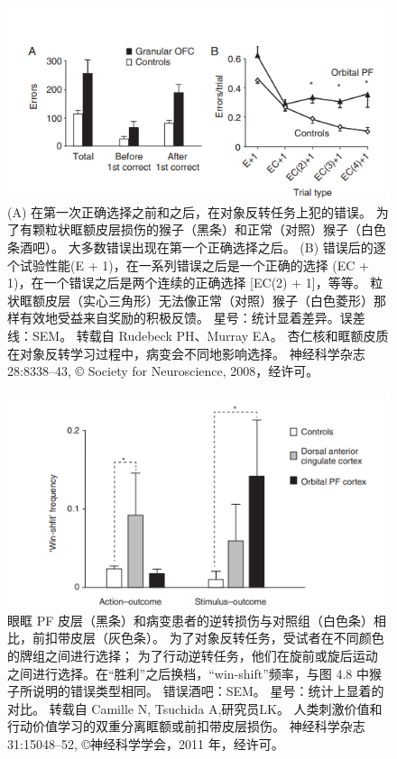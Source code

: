 \begin{figure}[!htb]
	\centering
	\includegraphics{image_pfc/Fig_4_8}
	\caption{(A) 在第一次正确选择之前和之后，在对象反转任务上犯的错误。 为了有颗粒状眶额皮层损伤的猴子（黑条）和正常（对照）猴子（白色条酒吧）。 大多数错误出现在第一个正确选择之后。 (B) 错误后的逐个试验性能(E + 1)，在一系列错误之后是一个正确的选择 (EC + 1)，在一个错误之后是两个连续的正确选择 [EC(2) + 1]，等等。 粒状眶额皮层（实心三角形）无法像正常（对照）猴子（白色菱形）那样有效地受益来自奖励的积极反馈。 星号：统计显着差异。误差线：SEM。 转载自 Rudebeck PH、Murray EA。 杏仁核和眶额皮质在对象反转学习过程中，病变会不同地影响选择。 神经科学杂志28:8338–43, © Society for Neuroscience, 2008，经许可。}
	\label{fig:fig_4_8}
\end{figure}


\begin{figure}[!htb]
	\centering
	\includegraphics{image_pfc/Fig_4_9}
	\caption{眼眶 PF 皮层（黑条）和病变患者的逆转损伤与对照组（白色条）相比，前扣带皮层（灰色条）。 为了对象反转任务，受试者在不同颜色的牌组之间进行选择； 为了行动逆转任务，他们在旋前或旋后运动之间进行选择。在“胜利”之后换档，“win-shift”频率，与图 4.8 中猴子所说明的错误类型相同。 错误酒吧：SEM。 星号：统计上显着的对比。 转载自 Camille N, Tsuchida A,研究员LK。 人类刺激价值和行动价值学习的双重分离眶额或前扣带皮层损伤。 神经科学杂志 31:15048–52, ©神经科学学会，2011 年，经许可。}
	\label{fig:fig_4_9}
\end{figure}


